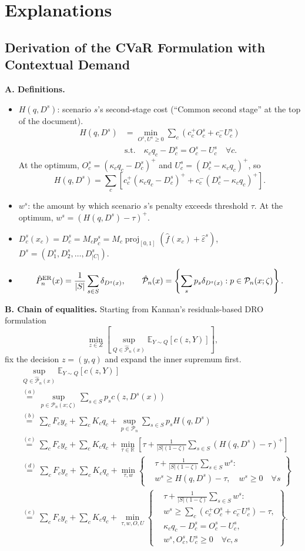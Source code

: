 \documentclass[10pt,a4paper]{article}
\newcommand{\proj}{\operatorname{proj}}
\newcommand{\fixedcosts}{\sum_c F_cy_c+\sum_c K_cq_c}
\begin{document}
\section{Explanations}
\subsection{Derivation of the CVaR Formulation with Contextual Demand}
\textbf{A. Definitions.}
\begin{itemize}
\item $H(q,D^s)$: scenario $s$'s second-stage cost (``Common second stage'' at the top of the document).
\[
\begin{aligned}
H(q,D^s)&=\min_{O^s,U^s\ge0}\sum_c(c_c^+O_c^s+c_c^-U_c^s)\\
&\text{s.t.}\quad\kappa_cq_c-D_c^s=O_c^s-U_c^s\quad\forall c.
\end{aligned}
\]
At the optimum, $O_c^s=(\kappa_cq_c-D_c^s)^+$ and $U_c^s=(D_c^s-\kappa_cq_c)^+$, so
\[
H(q,D^s)=\sum_c\left[c_c^+(\kappa_cq_c-D_c^s)^++c_c^-(D_c^s-\kappa_cq_c)^+\right].
\]
\item $w^s$: the amount by which scenario $s$'s penalty exceeds threshold $\tau$. At the optimum, $w^s=(H(q,D^s)-\tau)^+$.
\item $D_c^s(x_c)=D_c^s=M_cp_c^s=M_c\proj_{[0,1]}(\hat f(x_c)+\hat\varepsilon^s)$,\quad $D^s=(D_1^s,D_2^s,\ldots,D_{|C|}^s)$.
\item
\[
\hat P_n^{\rm ER}(x)=\frac1{|S|}\sum_{s\in S}\delta_{D^s(x)},\qquad
\hat{\mathcal P}_n(x)=\left\{\sum_sp_s\delta_{D^s(x)}:p\in\mathcal P_n(x;\zeta)\right\}.
\]
\end{itemize}
\textbf{B. Chain of equalities.} Starting from Kannan's residuals-based DRO formulation
\[
\min_{z\in Z}\left[\sup_{Q\in\hat{\mathcal P}_n(x)}\mathbb E_{Y\sim Q}[c(z,Y)]\right],
\]
fix the decision $z=(y,q)$ and expand the inner supremum first.
{\small
\begin{align*}
&\sup_{Q\in\hat{\mathcal P}_n(x)}\mathbb E_{Y\sim Q}[c(z,Y)]\\
&\overset{(a)}{=}\sup_{p\in\mathcal P_n(x;\zeta)}\sum_{s\in S}p_sc(z,D^s(x))\\
&\overset{(b)}{=}\fixedcosts+\sup_{p\in\mathcal P_n}\sum_{s\in S}p_sH(q,D^s)\\
&\overset{(c)}{=}\fixedcosts+\min_{\tau\in\mathbb R}\left[\tau+\frac1{|S|(1-\zeta)}\sum_{s\in S}(H(q,D^s)-\tau)^+\right]\\
&\overset{(d)}{=}\fixedcosts+\min_{\tau,w}\left\{\begin{aligned}
&\tau+\frac1{|S|(1-\zeta)}\sum_{s\in S}w^s:\\
&w^s\ge H(q,D^s)-\tau,\quad w^s\ge0\quad\forall s
\end{aligned}\right\}\\
&\overset{(e)}{=}\fixedcosts+\min_{\tau,w,O,U}\left\{\begin{aligned}
&\tau+\frac1{|S|(1-\zeta)}\sum_{s\in S}w^s:\\
&w^s\ge\sum_c(c_c^+O_c^s+c_c^-U_c^s)-\tau,\\
&\kappa_cq_c-D_c^s=O_c^s-U_c^s,\\
&w^s,O_c^s,U_c^s\ge0\quad\forall c,s
\end{aligned}\right\}.
\end{align*}}
\end{document}

